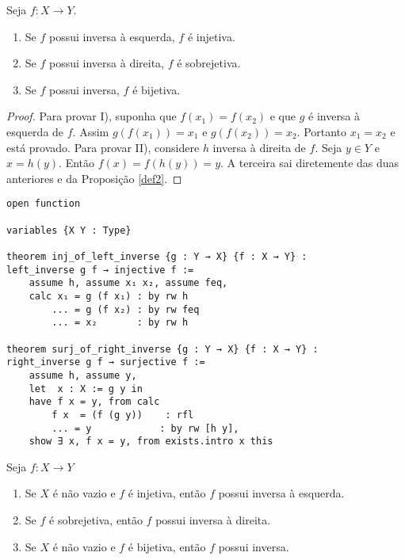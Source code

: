 \begin{theorem}
    \label{prop5}
    Seja $f : X \to Y$.
    \renewcommand{\labelenumi}{\Roman{enumi}}
    \begin{enumerate}
        \item Se $f$ possui inversa à esquerda, $f$ é injetiva.
        \item Se $f$ possui inversa à direita, $f$ é sobrejetiva.
        \item Se $f$ possui inversa, $f$ é bijetiva.
    \end{enumerate}
\end{theorem}
\begin{proof}
    Para provar I), suponha que $f(x_1) = f(x_2)$ e que $g$ é inversa à
    esquerda de $f$. Assim $g(f(x_1)) = x_1$ e $g(f(x_2)) = x_2$. Portanto
    $x_1 = x_2$ e está provado. Para provar II), considere $h$ inversa à
    direita de $f$. Seja $y \in Y$ e $x = h(y)$. Então $f(x) = f(h(y)) = y$. A
    terceira sai diretemente das duas anteriores e da Proposição \ref{def2}. 
\end{proof}

\begin{lstlisting}
open function

variables {X Y : Type}

theorem inj_of_left_inverse {g : Y → X} {f : X → Y} :
left_inverse g f → injective f :=
    assume h, assume x₁ x₂, assume feq,
    calc x₁ = g (f x₁) : by rw h
        ... = g (f x₂) : by rw feq
        ... = x₂       : by rw h

theorem surj_of_right_inverse {g : Y → X} {f : X → Y} :
right_inverse g f → surjective f :=
    assume h, assume y,
    let  x : X := g y in
    have f x = y, from calc
        f x  = (f (g y))    : rfl
        ... = y            : by rw [h y],
    show ∃ x, f x = y, from exists.intro x this
\end{lstlisting}

\begin{theorem}
    \label{prop6}
    Seja $f: X \to Y$
    \renewcommand{\labelenumi}{\Roman{enumi}}
    \begin{enumerate}
        \item Se $X$ é não vazio e $f$ é injetiva, então $f$ possui inversa à
        esquerda.
        \item Se $f$ é sobrejetiva, então $f$ possui inversa à direita.
        \item Se $X$ é não vazio e $f$ é bijetiva, então $f$ possui inversa.
    \end{enumerate}
\end{theorem}


